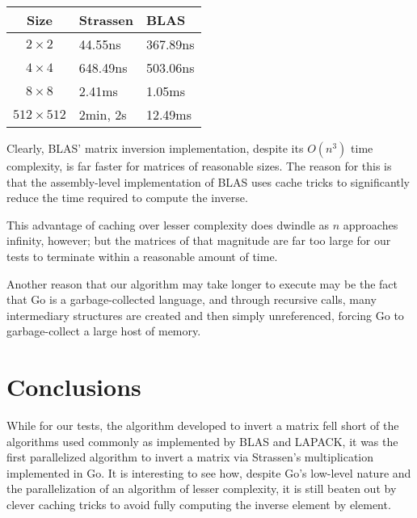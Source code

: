 \documentclass[12pt, letterpaper]{article}
\theoremstyle{remark}
\theoremstyle{remark}
\begin{document}
    \begin{center}

    
        \begin{tabular}{|c|l|l|}
    
            \hline
            Size & Strassen & BLAS  \\
            \hline\hline
            \(2\times2\) & 44.55ns & 367.89ns \\
            \hline
            \(4\times4\) & 648.49ns & 503.06ns \\
            \hline
            \(8\times8\) & 2.41ms & 1.05ms   \\
            \hline
            \(512\times512\) & 2min, 2s & 12.49ms \\
            \hline
        \end{tabular}
    
    \end{center}

    Clearly, BLAS' matrix inversion implementation, despite its \(O(n^3)\) time complexity, is far faster for matrices of reasonable sizes.
    The reason for this is that the assembly-level implementation of BLAS uses cache tricks to significantly reduce the time required to 
    compute the inverse.

    This advantage of caching over lesser complexity does dwindle as \(n\) approaches infinity, however; but the matrices of that magnitude are far 
    too large for our tests to terminate within a reasonable amount of time.

    Another reason that our algorithm may take longer to execute may be the fact that Go is a garbage-collected language, and through recursive calls, many 
    intermediary structures are created and then simply unreferenced, forcing Go to garbage-collect a large host of memory.

    \pagebreak

    \section{Conclusions}

    While for our tests, the algorithm developed to invert a matrix fell short of the algorithms used commonly 
    as implemented by BLAS and LAPACK, it was the first parallelized algorithm to invert a matrix via Strassen's multiplication 
    implemented in Go. It is interesting to see how, despite Go's low-level nature and the parallelization of an algorithm of lesser 
    complexity, it is still beaten out by clever caching tricks to avoid fully computing the inverse element by element.
\end{document}
